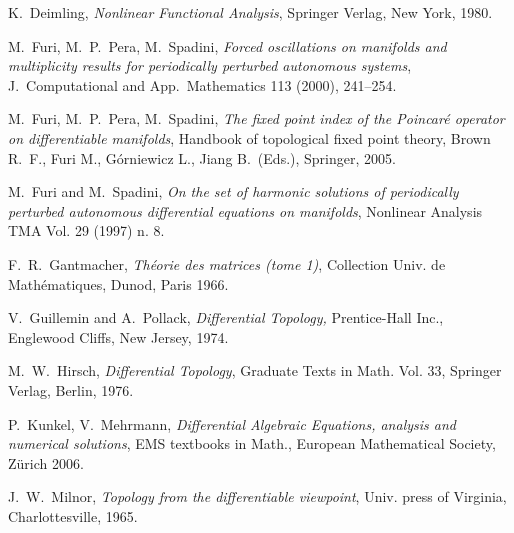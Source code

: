 \documentclass[a4paper]{amsart}
\numberwithin{equation}{section}
\begin{document}
\begin{thebibliography}{9}
 K.\ Deimling, \textit{Nonlinear Functional Analysis}, Springer Verlag, 
New York, 1980.

 M.\ Furi, M.\ P.\ Pera, M.\ Spadini, \textit{Forced oscillations on
manifolds and multiplicity results for periodically perturbed autonomous systems},
J.\ Computational and App.\ Mathematics 113 (2000), 241--254.

 M.\ Furi, M.\ P.\ Pera, M.\ Spadini, \textit{The fixed 
point index of the Poincar\'e operator on differentiable manifolds}, Handbook of topological 
fixed point theory, Brown R.\ F., Furi M., G\'orniewicz L., Jiang B.\ (Eds.), Springer, 2005.

 M.\ Furi and M.\ Spadini, \textit{On the set of harmonic solutions of 
periodically perturbed autonomous differential equations on manifolds}, Nonlinear Analysis TMA 
Vol. 29 (1997) n. 8.

 F.\ R.\ Gantmacher, \textit{Th\'eorie des matrices (tome 1)},
Collection Univ. de Math\'ematiques, Dunod, Paris 1966.

  V.\ Guillemin and A.\ Pollack, \textit{Differential Topology,}
Prentice-Hall Inc., Englewood Cliffs, New Jersey, 1974.

 M.\ W.\ Hirsch, \textit{Differential Topology},  Graduate Texts 
in Math. Vol. 33, Springer Verlag, Berlin, 1976.

 P.\ Kunkel, V.\ Mehrmann, \textit{Differential Algebraic Equations, analysis and
numerical solutions}, EMS textbooks in Math., European Mathematical Society, Z\"urich 2006.

 J.\ W.\ Milnor, \textit{Topology from the differentiable 
viewpoint}, Univ. press of Virginia, Charlottesville, 1965.

\end{thebibliography}
\end{document}
